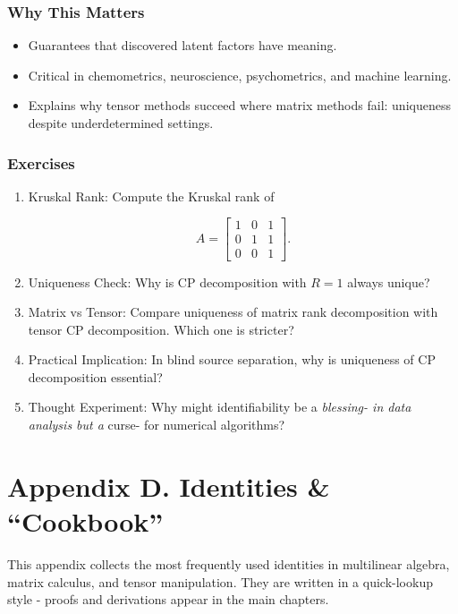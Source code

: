 \documentclass[
  letterpaper,
  DIV=11,
  numbers=noendperiod]{scrreprt}
\providecommand{\tightlist}{%
  \setlength{\itemsep}{0pt}\setlength{\parskip}{0pt}}
\begin{document}
\subsubsection{Why This Matters}\label{why-this-matters-64}

\begin{itemize}
\tightlist
\item
  Guarantees that discovered latent factors have meaning.
\item
  Critical in chemometrics, neuroscience, psychometrics, and machine
  learning.
\item
  Explains why tensor methods succeed where matrix methods fail:
  uniqueness despite underdetermined settings.
\end{itemize}

\subsubsection{Exercises}\label{exercises-79}

\begin{enumerate}
\def\labelenumi{\arabic{enumi}.}
\item
  Kruskal Rank: Compute the Kruskal rank of

  \[
  A = \begin{bmatrix}
  1 & 0 & 1 \\
  0 & 1 & 1 \\
  0 & 0 & 1
  \end{bmatrix}.
  \]
\item
  Uniqueness Check: Why is CP decomposition with \(R=1\) always unique?
\item
  Matrix vs Tensor: Compare uniqueness of matrix rank decomposition with
  tensor CP decomposition. Which one is stricter?
\item
  Practical Implication: In blind source separation, why is uniqueness
  of CP decomposition essential?
\item
  Thought Experiment: Why might identifiability be a \emph{blessing- in
  data analysis but a }curse- for numerical algorithms?
\end{enumerate}

\section{Appendix D. Identities \&
``Cookbook''}\label{appendix-d.-identities-cookbook}

This appendix collects the most frequently used identities in
multilinear algebra, matrix calculus, and tensor manipulation. They are
written in a quick-lookup style - proofs and derivations appear in the
main chapters.
\end{document}
